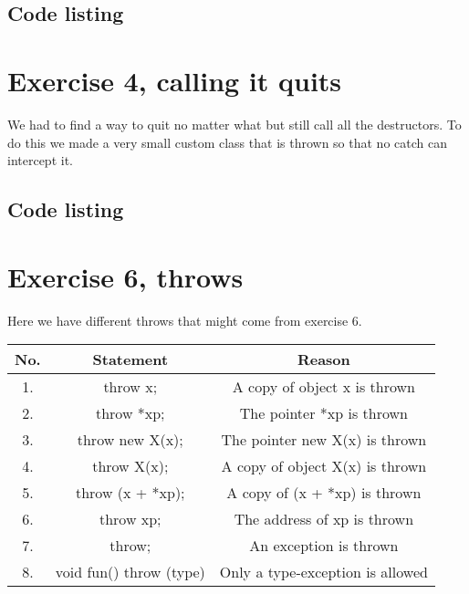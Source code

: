 \documentclass[11pt]{article}
\begin{document}
\subsection*{Code listing}











\section*{Exercise 4, calling it quits}
We had to find a way to quit no matter what but still call all the destructors.
To do this we made a very small custom class that is thrown so that no catch can intercept it.

\subsection*{Code listing}


\section*{Exercise 6, throws}
Here we have different throws that might come from exercise 6.

\begin{tabular}{|c|c|c|}
\hline
No. & Statement & Reason \\ \hline
1. & throw x; & A copy of object x is thrown \\ \hline
2. & throw *xp; & The pointer *xp is thrown \\ \hline
3. & throw new X(x); & The pointer new X(x) is thrown \\ \hline
4. & throw X(x); & A copy of object X(x) is thrown \\ \hline
5. & throw (x + *xp); & A copy of (x + *xp) is thrown \\ \hline
6. & throw xp; & The address of xp is thrown \\ \hline
7. & throw; & An exception is thrown \\ \hline
8. & void fun() throw (type) & Only a type-exception is allowed \\ \hline
\end{tabular}
\end{document}
